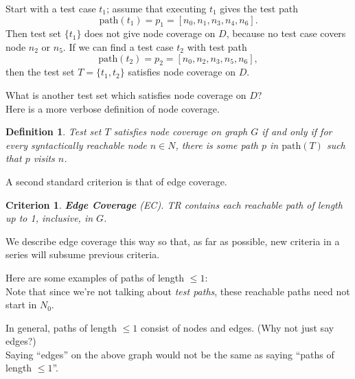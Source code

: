 \documentclass[11pt]{article}
\newtheorem{defn}{Definition}
\newtheorem{crit}{Criterion}
\begin{document}
Start with a test case $t_1$; assume that executing $t_1$ gives the
test path 
\[ \mbox{path}(t_1) = p_1 = [n_0, n_1, n_3, n_4, n_6].\] 
Then
test set $\{ t_1\}$ does not give node coverage on $D$, because no
test case covers node $n_2$ or $n_5$. If we can find a test case $t_2$
with test path 
\[\mbox{path}(t_2) = p_2 = [n_0, n_2, n_3, n_5, n_6],\]
then the test set $T = \{ t_1, t_2 \}$ satisfies node coverage on $D$.

{\sf What is another test set which satisfies node coverage on $D$?}\\[2em]


Here is a more verbose definition of node coverage.

\begin{defn}
Test set $T$ satisfies \emph{node coverage} on graph $G$ if and only
if for every syntactically reachable node $n \in N$, there is some
path $p$ in $\mbox{path}(T)$ such that $p$ visits $n$.
\end{defn}

A second standard criterion is that of edge coverage.
\begin{crit}
{\bf Edge Coverage} (EC). TR contains each reachable path of length up
to 1, inclusive, in $G$.
\end{crit}
We describe edge coverage this way so that, as far as possible, new
criteria in a series will subsume previous criteria.

{\sf Here are some examples of paths of length $\le 1$:}\\[1em]
Note that since we're not talking about \emph{test paths}, these
reachable paths need not start in $N_0$.

In general, paths of length $\le 1$ consist of nodes and edges. {\sf (Why not just
say edges?)}\\[3em]

Saying ``edges'' on the above graph would not be the same as saying ``paths
of length $\le 1$''.
\end{document}
